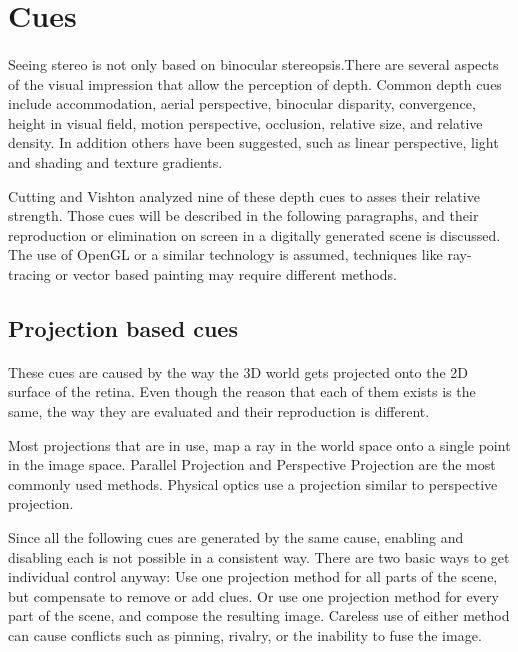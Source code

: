 \section{Cues}
\paragraph{}
Seeing stereo is not only based on binocular stereopsis.There are several aspects of the visual impression that allow the perception of depth. Common depth cues include accommodation, aerial perspective, binocular disparity, convergence, height in visual field, motion perspective, occlusion, relative size, and relative density. In addition others have been suggested, such as linear perspective, light and shading and texture gradients.%

Cutting and Vishton\cite{DepthCues} analyzed nine of these depth cues to asses their relative strength. Those cues will be described in the following paragraphs, and their reproduction or elimination on screen in a digitally generated scene is discussed. The use of OpenGL or a similar technology is assumed, techniques like ray-tracing or vector based painting may require different methods.


\subsection{Projection based cues}
\paragraph{}
These cues are caused by the way the 3D world gets projected onto the 2D surface of the retina.
Even though the reason that each of them exists is the same, the way they are evaluated and their reproduction is different.

Most projections\cite{proj} that are in use, map a ray in the world space onto a single point in the image space. Parallel Projection\cite{parallel} and Perspective Projection\cite{perspective} are the most commonly used methods. Physical optics use a projection similar to perspective projection.

Since all the following cues are generated by the same cause, enabling and disabling each is not possible in a consistent way. There are two basic ways to get individual control anyway: Use one projection method for all parts of the scene, but compensate to remove or add clues. Or use one projection method for every part of the scene, and compose the resulting image. Careless use of either method can cause conflicts such as pinning, rivalry, or the inability to fuse the image.


